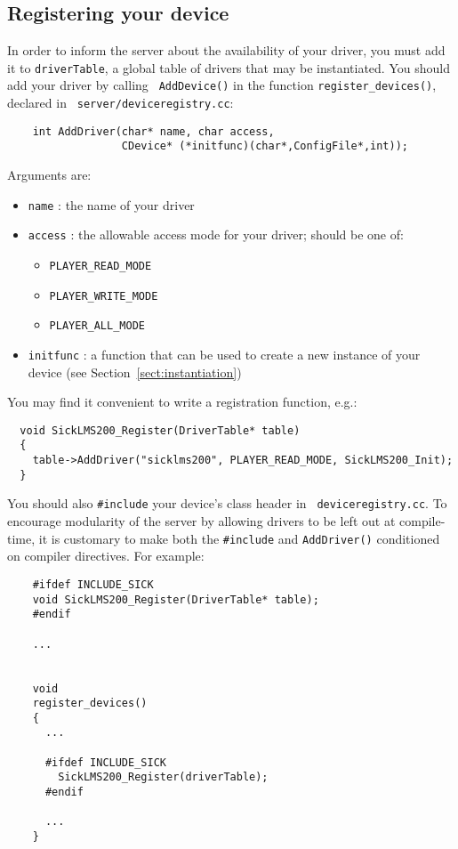 \documentclass[11pt]{report}
\begin{document}
\subsection{Registering your device}
\label{sect:register-device}
In order to inform the server about the availability of your driver,
you must add it to {\tt driverTable}, a global table of drivers
that may be instantiated.  You should add your driver by calling {\tt
AddDevice()} in the function {\tt register\_devices()}, declared in {\tt
server/deviceregistry.cc}:  
\begin{verbatim}
    int AddDriver(char* name, char access, 
                  CDevice* (*initfunc)(char*,ConfigFile*,int));
\end{verbatim}
Arguments are:
\begin{itemize}
\item {\tt name} : the name of your driver
\item {\tt access} : the allowable access mode for your driver; should be
one of:
\begin{itemize}
\item {\tt PLAYER\_READ\_MODE}
\item {\tt PLAYER\_WRITE\_MODE}
\item {\tt PLAYER\_ALL\_MODE}
\end{itemize}
\item {\tt initfunc} : a function that can be used to create
a new instance of your device (see Section~\ref{sect:instantiation})
\end{itemize}
You may find it convenient to write a registration function, e.g.:
\begin{verbatim}
  void SickLMS200_Register(DriverTable* table)
  {
    table->AddDriver("sicklms200", PLAYER_READ_MODE, SickLMS200_Init);
  }
\end{verbatim}
You should also {\tt \#include} your device's class header in {\tt
deviceregistry.cc}.   To encourage modularity of the server by allowing
drivers to be left out at compile-time, it is customary to make both the
{\tt \#include} and  {\tt AddDriver()} conditioned on compiler directives.
For example:
\begin{verbatim}
    #ifdef INCLUDE_SICK
    void SickLMS200_Register(DriverTable* table);
    #endif

    ...


    void
    register_devices()
    {
      ...

      #ifdef INCLUDE_SICK
        SickLMS200_Register(driverTable);
      #endif

      ...
    }
\end{verbatim}
\end{document}
